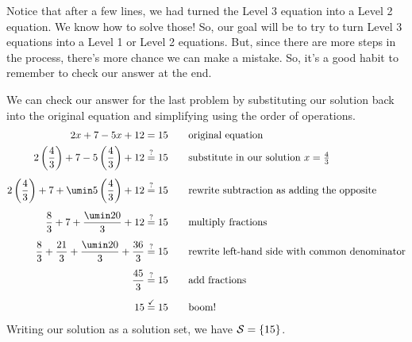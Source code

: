 Notice that after a few lines, we had turned the Level 3 equation into a Level 2 equation. We know how to solve those! So, our goal will be to try to turn Level 3 equations into a Level 1 or Level 2 equations. But, since there are more steps in the process, there's more chance we can make a mistake. So, it's a good habit to remember to check our answer at the end.

We can check our answer for the last problem by substituting our solution back into the original equation and simplifying using the order of operations.
\[\begin{aligned}
2x + 7 - 5x + 12 & = 15
&& \text{\quad original equation}\\
2\left(\frac{4}{3}\right) + 7 - 5\left(\frac{4}{3}\right) + 12 & \overset{?}{=} 15
&& \text{\quad substitute in our solution $x = \tfrac{4}{3}$}\\[1ex]
2\left(\frac{4}{3}\right) + 7 + \umin5\left(\frac{4}{3}\right) + 12 & \overset{?}{=} 15
&& \text{\quad rewrite subtraction as adding the opposite}\\[1ex]
\frac{8}{3} + 7 + \frac{\umin20}{3} + 12 & \overset{?}{=} 15
&& \text{\quad multiply fractions}\\[1ex]
\frac{8}{3} + \frac{21}{3} + \frac{\umin20}{3} + \frac{36}{3} & \overset{?}{=} 15
&& \text{\quad rewrite left-hand side with common denominator}\\[1ex]
\frac{45}{3} & \overset{?}{=} 15
&& \text{\quad add fractions}\\[1ex]
15 & \overset{\checkmark}{=} 15
&& \text{\quad boom!}
\end{aligned}\]
Writing our solution as a solution set, we have $\mathcal{S}=\left\{15\right\}$.

